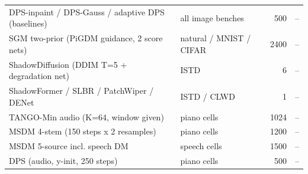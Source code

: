\begin{table}[t]
\begin{tabular}{llrr}
DPS-inpaint / DPS-Gauss / adaptive DPS (baselines) & all image benches & 500 & -- \\
SGM two-prior (PiGDM guidance, 2 score nets) & natural / MNIST / CIFAR & 2400 & -- \\
ShadowDiffusion (DDIM T=5 + degradation net) & ISTD & 6 & -- \\
ShadowFormer / SLBR / PatchWiper / DENet & ISTD / CLWD & 1 & -- \\
TANGO-Min audio (K=64, window given) & piano cells & 1024 & -- \\
MSDM 4-stem (150 steps x 2 resamples) & piano cells & 1200 & -- \\
MSDM 5-source incl. speech DM & speech cells & 1500 & -- \\
DPS (audio, y-init, 250 steps) & piano cells & 500 & -- \\
\bottomrule
\end{tabular}
\end{table}
